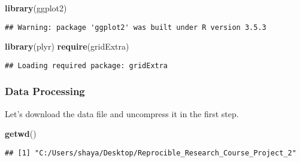 \documentclass[]{article}
\newenvironment{Shaded}{\begin{snugshade}}{\end{snugshade}}
\newcommand{\KeywordTok}[1]{\textcolor[rgb]{0.13,0.29,0.53}{\textbf{#1}}}
\newcommand{\DataTypeTok}[1]{\textcolor[rgb]{0.13,0.29,0.53}{#1}}
\newcommand{\StringTok}[1]{\textcolor[rgb]{0.31,0.60,0.02}{#1}}
\newcommand{\ControlFlowTok}[1]{\textcolor[rgb]{0.13,0.29,0.53}{\textbf{#1}}}
\newcommand{\OperatorTok}[1]{\textcolor[rgb]{0.81,0.36,0.00}{\textbf{#1}}}
\newcommand{\NormalTok}[1]{#1}
\begin{document}
\begin{Shaded}
\begin{Highlighting}[]
\KeywordTok{library}\NormalTok{(ggplot2)}
\end{Highlighting}
\end{Shaded}

\begin{verbatim}
## Warning: package 'ggplot2' was built under R version 3.5.3
\end{verbatim}

\begin{Shaded}
\begin{Highlighting}[]
\KeywordTok{library}\NormalTok{(plyr)}
\KeywordTok{require}\NormalTok{(gridExtra)}
\end{Highlighting}
\end{Shaded}

\begin{verbatim}
## Loading required package: gridExtra
\end{verbatim}

\subsubsection{Data Processing}\label{data-processing}

Let's download the data file and uncompress it in the first step.

\begin{Shaded}
\begin{Highlighting}[]
\KeywordTok{getwd}\NormalTok{()}
\end{Highlighting}
\end{Shaded}

\begin{verbatim}
## [1] "C:/Users/shaya/Desktop/Reprocible_Research_Course_Project_2"
\end{verbatim}

\begin{Shaded}
\end{Shaded}
\end{document}
